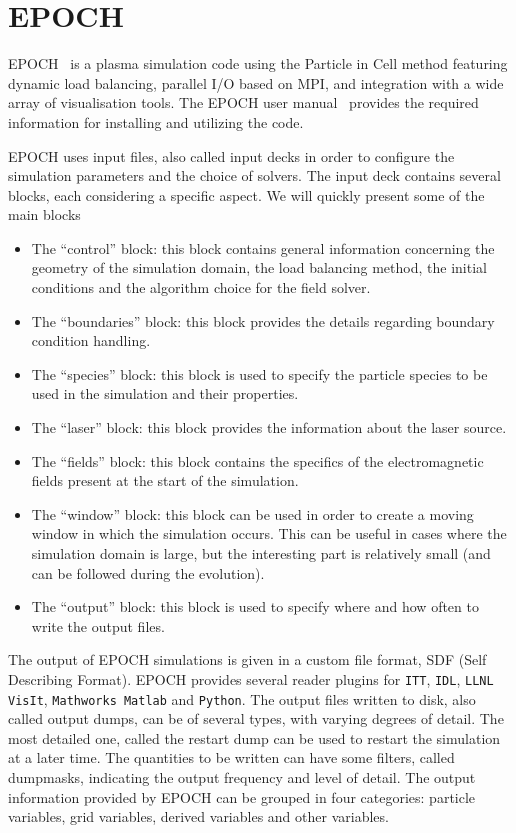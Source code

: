 \documentclass[12pt, class=report, crop=false]{standalone}
\begin{document}
\section{EPOCH}

EPOCH~\autocite{arber_contemporaryparticleincell_2015} is a plasma simulation
code using the Particle in Cell method featuring dynamic
load balancing, parallel I/O based on MPI, and integration
with a wide array of visualisation tools.
The EPOCH user manual~\autocite{bennett_usersmanual_2019} provides the required information for installing and
utilizing the code.

EPOCH uses input files, also called input decks in order to
configure the simulation parameters and the choice of solvers.
The input deck contains several blocks, each considering a specific aspect.
We will quickly present some of the main blocks
\begin{itemize}
  \item The ``control'' block: this block contains general information concerning the geometry of the simulation
  domain, the load balancing method, the initial conditions and the algorithm choice for the
  field solver.
  \item The ``boundaries'' block: this block provides the details regarding boundary condition handling.
  \item The ``species'' block: this block is used to specify the particle species to be used in the simulation
  and their properties.
  \item The ``laser'' block: this block provides the information about the laser source.
  \item The ``fields'' block: this block contains the specifics of the electromagnetic fields present at the start of the simulation.
  \item The ``window'' block: this block can be used in order to create a moving window in which the simulation
  occurs. This can be useful in cases where the simulation domain is large, but the interesting part is relatively small (and can be followed during the evolution).
  \item The ``output'' block: this block is used to specify where and how often to write the output files.
\end{itemize}

The output of EPOCH simulations is given in a custom file format, SDF (Self Describing Format).
EPOCH provides several reader plugins for \texttt{ITT},
\texttt{IDL}, \texttt{LLNL VisIt}, \texttt{Mathworks Matlab} and \texttt{Python}.
The output files written to disk, also called output dumps, can be of several types,
with varying degrees of detail. The most detailed one, called
the restart dump can be used to restart the simulation at a later time.
The quantities to be written can have some filters, called dumpmasks, indicating the output frequency and level of detail.
The output information provided by EPOCH can be grouped in
four categories: particle variables, grid variables, derived variables and other variables.
\end{document}
